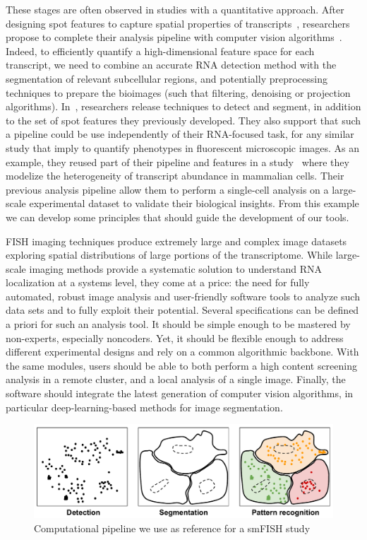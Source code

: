 \noindent
These stages are often observed in studies with a quantitative approach.
After designing spot features to capture spatial properties of transcripts~\cite{battich_image-based_2013}, researchers propose to complete their analysis pipeline with computer vision algorithms~\cite{stoeger_computer_2015}.
Indeed, to efficiently quantify a high-dimensional feature space for each transcript, we need to combine an accurate \ac{RNA} detection method with the segmentation of relevant subcellular regions, and potentially preprocessing techniques to prepare the bioimages (such that filtering, denoising or projection algorithms).
In~\cite{stoeger_computer_2015}, researchers release techniques to detect and segment, in addition to the set of spot features they previously developed.
They also support that such a pipeline could be use independently of their \ac{RNA}-focused task, for any similar study that imply to quantify phenotypes in fluorescent microscopic images.
As an example, they reused part of their pipeline and features in a study~\cite{battich_control_2015} where they modelize the heterogeneity of transcript abundance in mammalian cells.
Their previous analysis pipeline allow them to perform a single-cell analysis on a large-scale experimental dataset to validate their biological insights.
From this example we can develop some principles that should guide the development of our tools.

\ac{FISH} imaging techniques produce extremely large and complex image datasets exploring spatial distributions of large portions of the transcriptome.
While large-scale imaging methods provide a systematic solution to understand \ac{RNA} localization at a systems level, they come at a price: the need for fully automated, robust image analysis and user-friendly software tools to analyze such data sets and to fully exploit their potential.
Several specifications can be defined a priori for such an analysis tool.
It should be simple enough to be mastered by non-experts, especially noncoders.
Yet, it should be flexible enough to address different experimental designs and rely on a common algorithmic backbone.
With the same modules, users should be able to both perform a high content screening analysis in a remote cluster, and a local analysis of a single image.
Finally, the software should integrate the latest generation of computer vision algorithms, in particular deep-learning-based methods for image segmentation.

\begin{figure}[h]
    \centering
    \includegraphics[width=\textwidth]{figures/chapter1/schema_pipeline}
    \caption{Computational pipeline we use as reference for a smFISH study}
    \label{fig:pipeline}
\end{figure}

